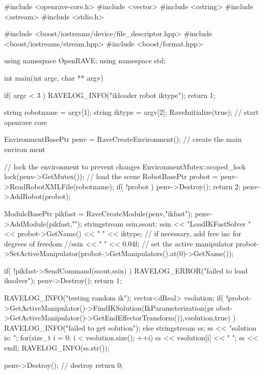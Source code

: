 \begin{DoxyCodeInclude}

#include <openrave-core.h>
#include <vector>
#include <cstring>
#include <sstream>
#include <stdio.h>

#include <boost/iostreams/device/file_descriptor.hpp>
#include <boost/iostreams/stream.hpp>
#include <boost/format.hpp>

using namespace OpenRAVE;
using namespace std;

int main(int argc, char ** argv)
{
    if( argc < 3 ) {
        RAVELOG_INFO("ikloader robot iktype\n");
        return 1;
    }

    string robotname = argv[1];
    string iktype = argv[2];
    RaveInitialize(true); // start openrave core

    EnvironmentBasePtr penv = RaveCreateEnvironment(); // create the main environ
      ment

    {
        // lock the environment to prevent changes
        EnvironmentMutex::scoped_lock lock(penv->GetMutex());
        // load the scene
        RobotBasePtr probot = penv->ReadRobotXMLFile(robotname);
        if( !probot ) {
            penv->Destroy();
            return 2;
        }
        penv->AddRobot(probot);

        ModuleBasePtr pikfast = RaveCreateModule(penv,"ikfast");
        penv->AddModule(pikfast,"");
        stringstream ssin,ssout;
        ssin << "LoadIKFastSolver " << probot->GetName() << " " << iktype;
        // if necessary, add free inc for degrees of freedom
        //ssin << " " << 0.04f;
        // set the active manipulator
        probot->SetActiveManipulator(probot->GetManipulators().at(0)->GetName());
      
        if( !pikfast->SendCommand(ssout,ssin) ) {
            RAVELOG_ERROR("failed to load iksolver\n");
            penv->Destroy();
            return 1;
        }

        RAVELOG_INFO("testing random ik\n");
        vector<dReal> vsolution;
        if( !probot->GetActiveManipulator()->FindIKSolution(IkParameterization(pr
      obot->GetActiveManipulator()->GetEndEffectorTransform()),vsolution,true) ) {
            RAVELOG_INFO("failed to get solution\n");
        }
        else {
            stringstream ss; ss << "solution is: ";
            for(size_t i = 0; i < vsolution.size(); ++i) {
                ss << vsolution[i] << " ";
            }
            ss << endl;
            RAVELOG_INFO(ss.str());
        }
    }

    penv->Destroy(); // destroy
    return 0;
}
\end{DoxyCodeInclude}
 